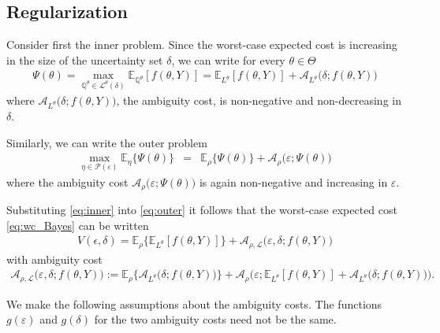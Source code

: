 \documentclass[10pt,a4paper]{amsart}
\numberwithin{equation}{section}
\numberwithin{theorem}{section}
\numberwithin{table}{section}
\numberwithin{figure}{section}
\begin{document}
\subsection{Regularization}

Consider first the inner problem. Since the worst-case expected cost is increasing in the size of the uncertainty set $\delta$, we can write for every $\theta\in\Theta$
\begin{eqnarray}
\Psi(\theta) = \max_{{\mathbb Q}^\theta \in {\mathcal L}^\theta(\delta)} {\mathbb E}_{{\mathbb Q}^\theta} [f(\theta, Y)] 
   =    {\mathbb E}_{L^\theta}[f(\theta, Y)]  + {\mathcal A}_{L^\theta}\big(\delta; f(\theta, Y)\big)
   \label{eq:inner}
   \end{eqnarray}
where   ${\mathcal A}_{L^\theta}\big(\delta; f(\theta, Y)\big)$, the ambiguity cost, is non-negative and non-decreasing in $\delta$. 

Similarly, we can write the outer problem
\begin{eqnarray}
\max_{\eta \in {\mathcal P}(\varepsilon)} {\mathbb E}_\eta \big\{\Psi(\theta) \big\} & = & {\mathbb E}_\rho \big\{\Psi(\theta) \big\} + {\mathcal A}_{\rho}\big(\varepsilon; \Psi(\theta)\big)
\label{eq:outer}
\end{eqnarray}
where the ambiguity cost ${\mathcal A}_{\rho}\big(\varepsilon; \Psi(\theta)\big)$ is again non-negative and increasing in $\varepsilon$.


Substituting \eqref{eq:inner} into \eqref{eq:outer} it  follows that the worst-case expected cost \ref{eq:wc_Bayes} can be written
\begin{eqnarray*}
V(\epsilon, \delta)  = {\mathbb E}_\rho \Big\{{\mathbb E}_{L^\theta}[f(\theta, Y)]  \Big\} + {\mathcal A}_{\rho,{\mathcal L}}\big(\varepsilon, \delta; f(\theta, Y)\big)
\end{eqnarray*}
with ambiguity cost
\begin{eqnarray*}
{\mathcal A}_{\rho,{\mathcal L}}\big(\varepsilon, \delta; f(\theta, Y)\big) := {\mathbb E}_\rho \Big\{ {\mathcal A}_{L^\theta}\big(\delta; f(\theta, Y)\big) \Big\} + {\mathcal A}_{\rho}\Big(\varepsilon; {\mathbb E}_{L^\theta}[f(\theta, Y)]  + {\mathcal A}_{L^\theta}\big(\delta; f(\theta, Y)\big)\Big).
\end{eqnarray*}



We make the following assumptions about the ambiguity costs. The functions $g(\varepsilon)$ and $g(\delta)$ for the two ambiguity costs need not be the same.
\end{document}
